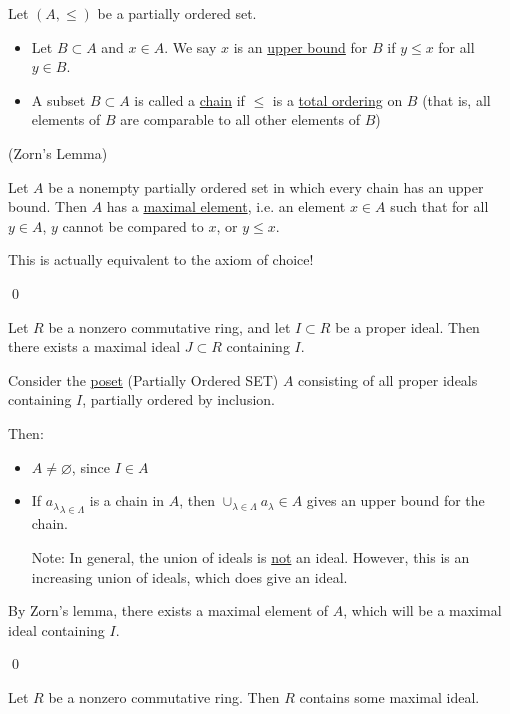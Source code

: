 \documentclass[x11names,reqno,14pt]{extarticle}
\begin{document}

Let $(A, \leq)$ be a partially ordered set. 
\begin{itemize}
\item Let $B \subset A$ and $x \in A$. We say $x$ is an \underline{upper bound} for $B$ if $y \leq x$ for all $y \in B$. 
\item A subset $B\subset A$ is called a \underline{chain} if $\leq$ is a \underline{total ordering} on $B$ (that is, all elements of $B$ are comparable to all other elements of $B$)
\end{itemize}

\lem (Zorn's Lemma)

Let $A$ be a nonempty partially ordered set in which every chain has an upper bound. Then $A$ has a \underline{maximal element}, i.e. an element $x \in A$ such that for all $y \in A$, $y$ cannot be compared to $x$, or $y \leq x$. 

\proof

This is actually equivalent to the axiom of choice!

\qed

\thm 

Let $R$ be a nonzero commutative ring, and let $I\subset R$ be a proper ideal. Then there exists a maximal ideal $J \subset R$ containing $I$. 

\proof

Consider the \underline{poset} (Partially Ordered SET) $A$ consisting of all proper ideals containing $I$, partially ordered by inclusion. 

Then: 
\begin{itemize}
\item $A\neq\varnothing$, since $I \in A$
\item If ${a_{\lambda}}_{\lambda\in\Lambda}$ is a chain in $A$, then $\cup_{\lambda\in\Lambda}a_{\lambda} \in A$ gives an upper bound for the chain. 

Note: In general, the union of ideals is \underline{not} an ideal. However, this is an increasing union of ideals, which does give an ideal. 

\end{itemize}

By Zorn's lemma, there exists a maximal element of $A$, which will be a maximal ideal containing $I$. 

\qed

\cor

Let $R$ be a nonzero commutative ring. Then $R$ contains some maximal ideal. 
\end{document}
